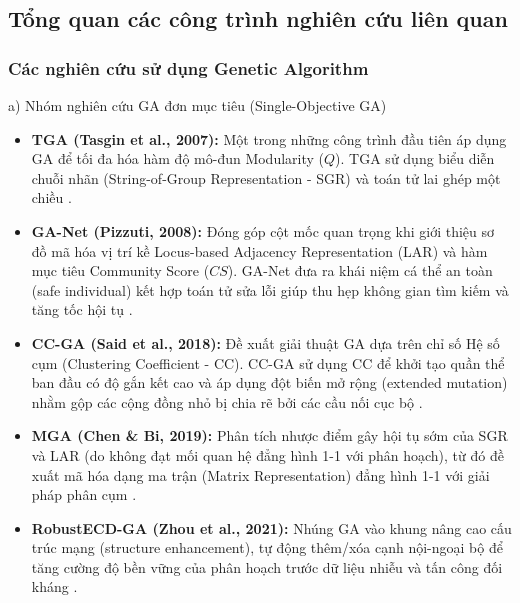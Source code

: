\documentclass[14pt,a4paper]{extarticle}
\begin{document}
\subsection{Tổng quan các công trình nghiên cứu liên quan}

\subsubsection{Các nghiên cứu sử dụng Genetic Algorithm}

\noindent a) Nhóm nghiên cứu GA đơn mục tiêu (Single-Objective GA)
\begin{itemize}
    \item \textbf{TGA (Tasgin et al., 2007):} Một trong những công trình đầu tiên áp dụng GA để tối đa hóa hàm độ mô-đun Modularity ($Q$). TGA sử dụng biểu diễn chuỗi nhãn (String-of-Group Representation - SGR) và toán tử lai ghép một chiều \cite{Chen2019}.
    \item \textbf{GA-Net (Pizzuti, 2008):} Đóng góp cột mốc quan trọng khi giới thiệu sơ đồ mã hóa vị trí kề Locus-based Adjacency Representation (LAR) và hàm mục tiêu Community Score ($CS$). GA-Net đưa ra khái niệm cá thể an toàn (safe individual) kết hợp toán tử sửa lỗi giúp thu hẹp không gian tìm kiếm và tăng tốc hội tụ \cite{Pizzuti2008}.
    \item \textbf{CC-GA (Said et al., 2018):} Đề xuất giải thuật GA dựa trên chỉ số Hệ số cụm (Clustering Coefficient - CC). CC-GA sử dụng CC để khởi tạo quần thể ban đầu có độ gắn kết cao và áp dụng đột biến mở rộng (extended mutation) nhằm gộp các cộng đồng nhỏ bị chia rẽ bởi các cầu nối cục bộ \cite{Said2018}.
    \item \textbf{MGA (Chen \& Bi, 2019):} Phân tích nhược điểm gây hội tụ sớm của SGR và LAR (do không đạt mối quan hệ đẳng hình 1-1 với phân hoạch), từ đó đề xuất mã hóa dạng ma trận (Matrix Representation) đẳng hình 1-1 với giải pháp phân cụm \cite{Chen2019}.
    \item \textbf{RobustECD-GA (Zhou et al., 2021):} Nhúng GA vào khung nâng cao cấu trúc mạng (structure enhancement), tự động thêm/xóa cạnh nội-ngoại bộ để tăng cường độ bền vững của phân hoạch trước dữ liệu nhiễu và tấn công đối kháng \cite{Zhou2021}.
\end{itemize}
\end{document}
